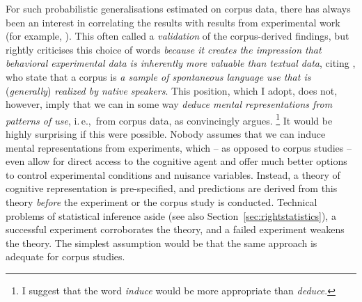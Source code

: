 \documentclass[USenglish]{article}
\newcommand{\ie}{i.\,e.,}
\begin{document}
For such probabilistic generalisations estimated on corpus data, there has always been an interest in correlating the results with results from experimental work (for example, \citealp{ArppeJaervikivi2007,BresnanEa2007,BresnanFord2010,DivjakGries2008,DivjakEa2016,FordBresnan2013}).
This often called a \textit{validation} of the corpus-derived findings, but \citet[303]{Divjak2016a} rightly criticises this choice of words \textit{because it creates the impression that behavioral experimental data is inherently more valuable than textual data}, citing \cite{TummersEa2005}, who state that a corpus is \textit{a sample of spontaneous language use that is} (\textit{generally}) \textit{realized by native speakers}.
This position, which I adopt, does not, however, imply that we can in some way \textit{deduce mental representations from patterns of use}, \ie\ from corpus data, as  \citet[486--487]{Dabrowska2016} convincingly argues.%
\footnote{I suggest that the word \textit{induce} would be more appropriate than \textit{deduce}.}
It would be highly surprising if this were possible.
Nobody assumes that we can induce mental representations from experiments, which -- as opposed to corpus studies -- even allow for direct access to the cognitive agent and offer much better options to control experimental conditions and nuisance variables.
Instead, a theory of cognitive representation is pre-specified, and predictions are derived from this theory \textit{before} the experiment or the corpus study is conducted.
Technical problems of statistical inference aside (see also Section~\ref{sec:rightstatistics}), a successful experiment corroborates the theory, and a failed experiment weakens the theory.
The simplest assumption would be that the same approach is adequate for corpus studies.
\end{document}
